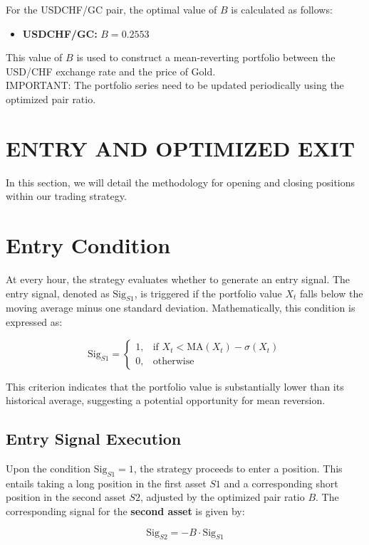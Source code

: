 \documentclass{article}
\begin{document}
For the USDCHF/GC pair, the optimal value of \( B \) is calculated as follows:
\begin{itemize}
    \item \textbf{USDCHF/GC:} \( B = 0.2553 \)
\end{itemize}

This value of \( B \) is used to construct a mean-reverting portfolio between the USD/CHF exchange rate and the price of Gold.\\

IMPORTANT: The portfolio series need to be updated periodically using the optimized pair ratio.

\section{ENTRY AND OPTIMIZED EXIT}
In this section, we will detail the methodology for opening and closing positions within our trading strategy.
\section*{Entry Condition}

At every hour, the strategy evaluates whether to generate an entry signal. The entry signal, denoted as \( \text{Sig}_{S1} \), is triggered if the portfolio value \( X_t \) falls below the moving average minus one standard deviation. Mathematically, this condition is expressed as:

\[
\text{Sig}_{S1} = 
\begin{cases} 
1, & \text{if } X_t < \text{MA}(X_t) - \sigma(X_t) \\
0, & \text{otherwise}
\end{cases}
\]

This criterion indicates that the portfolio value is substantially lower than its historical average, suggesting a potential opportunity for mean reversion.


\subsection*{Entry Signal Execution}
Upon the condition \( \text{Sig}_{S1} = 1 \), the strategy proceeds to enter a position. This entails taking a long position in the first asset \( S1 \) and a corresponding short position in the second asset \( S2 \), adjusted by the optimized pair ratio \( B \). The corresponding signal for the \textbf{second asset} is given by:

\[
\text{Sig}_{S2} = -B \cdot \text{Sig}_{S1}
\]
\end{document}
